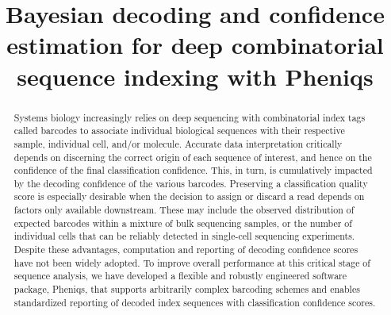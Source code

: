 \documentclass[twocolumn]{bmcart}
\begin{document}
\begin{frontmatter}
\begin{fmbox}

\title{Bayesian decoding and confidence estimation for deep combinatorial sequence indexing with Pheniqs}

\author[addressref={aff1}, email={lg1883@nyu.edu}]{
}
\author[addressref={aff2}, email={shasha@courant.nyu.edu}]{
}
\author[addressref={aff1}, corref={aff1}, email={kcg1@nyu.edu}]{
}
\address[id=aff1] {
    ,
    ,
    ,
}
\address[id=aff2] {
    ,
    ,
    ,
}



\begin{abstractbox}
\begin{abstract}
Systems biology increasingly relies on deep sequencing with combinatorial index tags called barcodes to associate individual biological sequences with their respective sample, individual cell, and/or molecule. Accurate data interpretation critically depends on discerning the correct origin of each sequence of interest, and hence on the confidence of the final classification confidence. This, in turn, is cumulatively impacted by the decoding confidence of the various barcodes. Preserving a classification quality score is especially desirable when the decision to assign or discard a read depends on factors only available downstream. These may include the observed distribution of expected barcodes within a mixture of bulk sequencing samples, or the number of individual cells that can be reliably detected in single-cell sequencing experiments. Despite these advantages, computation and reporting of decoding confidence scores have not been widely adopted. To improve overall performance at this critical stage of sequence analysis, we have developed a flexible and robustly engineered software package, Pheniqs, that supports arbitrarily complex barcoding schemes and enables standardized reporting of decoded index sequences with classification confidence scores.


\end{abstract}
\end{abstractbox}
\end{fmbox}
\end{frontmatter}
\end{document}
